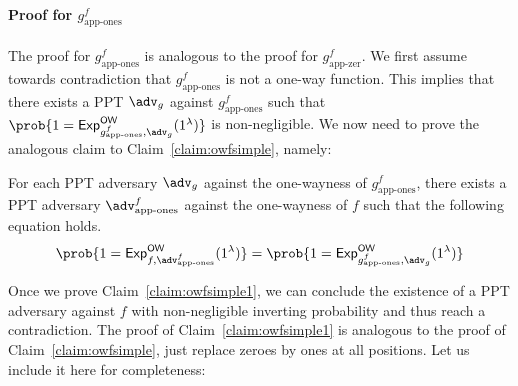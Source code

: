 \paragraph{Proof for $g^f_{\text{app-ones}}$} The proof for $g^f_{\text{app-ones}}$ is analogous to the proof for $g^f_{\text{app-zer}}$. We first assume towards contradiction that $g^f_{\text{app-ones}}$ is not a one-way function. This implies that there exists a PPT $\adv_g$ against $g^f_{\text{app-ones}}$ such that $\prob{1={\mathsf{Exp}}_{g^f_{\text{app-ones}},\adv_g}^{\mathsf{OW}}(1^\lambda)}$ is non-negligible.
We now need to prove the analogous claim to Claim~\ref{claim:owfsimple}, namely:
\begin{claim}\label{claim:owfsimple1}
	For each PPT adversary $\adv_g$ against the one-wayness of $g^f_{\text{app-ones}}$, there exists a PPT adversary $\adv^f_{\text{app-ones}}$ against the one-wayness of $f$ such that the following equation holds.
	\begin{equation}\label{eq:reductionowfones}
		\prob{1={\mathsf{Exp}}_{f,\adv^f_{\text{app-ones}}}^{\mathsf{OW}}(1^\lambda)}=\prob{1={\mathsf{Exp}}_{g^f_{\text{app-ones}},\adv_g}^{\mathsf{OW}}(1^\lambda)}
	\end{equation}
\end{claim}
Once we prove Claim~\ref{claim:owfsimple1}, we can conclude the existence of a PPT adversary against $f$ with non-negligible inverting probability and thus reach a contradiction. The proof of Claim~\ref{claim:owfsimple1} is analogous to the proof of Claim~\ref{claim:owfsimple}, just replace zeroes by ones at all positions. Let us include it here for completeness:
